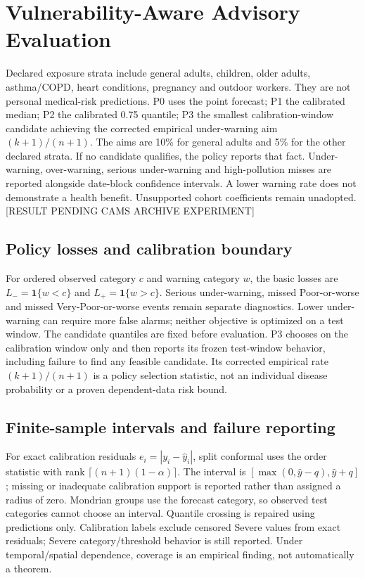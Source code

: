 \documentclass[journal]{IEEEtran}
\begin{document}
\section{Vulnerability-Aware Advisory Evaluation}
Declared exposure strata include general adults, children, older adults,
asthma/COPD, heart conditions, pregnancy and outdoor workers. They are not
personal medical-risk predictions. P0 uses the point forecast; P1 the calibrated
median; P2 the calibrated 0.75 quantile; P3 the smallest calibration-window
candidate achieving the corrected empirical under-warning aim $(k+1)/(n+1)$.
The aims are 10\% for general adults and 5\% for the other declared strata.
If no candidate qualifies, the policy reports that fact.
Under-warning, over-warning, serious under-warning and high-pollution misses
are reported alongside date-block confidence intervals. A lower warning rate
does not demonstrate a health benefit. Unsupported cohort coefficients remain
unadopted. [RESULT PENDING CAMS ARCHIVE EXPERIMENT]
\subsection{Policy losses and calibration boundary}
For ordered observed category $c$ and warning category $w$, the basic losses
are $L_-=\mathbf{1}\{w<c\}$ and $L_+=\mathbf{1}\{w>c\}$.
Serious under-warning, missed Poor-or-worse and missed Very-Poor-or-worse
events remain separate diagnostics. Lower under-warning can require more
false alarms; neither objective is optimized on a test window.
The candidate quantiles are fixed before evaluation. P3 chooses on the
calibration window only and then reports its frozen test-window behavior,
including failure to find any feasible candidate. Its corrected empirical
rate $(k+1)/(n+1)$ is a policy selection statistic, not an individual disease
probability or a proven dependent-data risk bound.
\subsection{Finite-sample intervals and failure reporting}
For exact calibration residuals $e_i=|y_i-\widehat y_i|$, split conformal
uses the order statistic with rank $\lceil(n+1)(1-\alpha)\rceil$.
The interval is $[\max(0,\widehat y-q),\widehat y+q]$; missing or inadequate
calibration support is reported rather than assigned a radius of zero.
Mondrian groups use the forecast category, so observed test categories cannot
choose an interval. Quantile crossing is repaired using predictions only.
Calibration labels exclude censored Severe values from exact residuals;
Severe category/threshold behavior is still reported. Under temporal/spatial
dependence, coverage is an empirical finding, not automatically a theorem.
\end{document}
